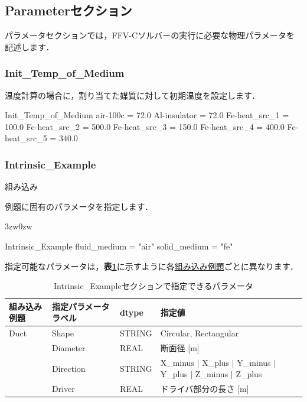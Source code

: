 \pagebreak
\subsection{Parameterセクション}

パラメータセクションでは，FFV-Cソルバーの実行に必要な物理パラメータを記述します．


\subsubsection{Init\_Temp\_of\_Medium}
温度計算の場合に，割り当てた\hypertarget{tgt:initial_temp}{媒質}に対して初期温度を設定します．


{\small
\begin{program}
  Init_Temp_of_Medium {
    air-100c      = 72.0
    Al-insulator  = 72.0
    Fe-heat_src_1 = 100.0
    Fe-heat_src_2 = 500.0
    Fe-heat_src_3 = 150.0
    Fe-heat_src_4 = 400.0
    Fe-heat_src_5 = 340.0
  }
\end{program}
}



\pagebreak
\subsubsection{Intrinsic\_Example}

\hypertarget{tgt:intrinsic_example}{組み込み}例題に固有のパラメータを指定します．

\begin{indentation}{3zw}{0zw}
\small

\begin{program}
  Intrinsic_Example {
    fluid_medium = "air"
    solid_medium = "fe"
  }
\end{program}

\normalsize
指定可能なパラメータは，\textbf{表\ref{tbl:intrinsic_parameter}}に示すように各\hyperlink{tgt:example}{組み込み例題}ごとに異なります．

\begin{table}[htdp]
\caption{Intrinsic\_Exampleセクションで指定できるパラメータ}
\begin{center}
\small
\begin{tabular}{llll} \toprule
組み込み例題 & 指定パラメータラベル & dtype & 指定値\\ \midrule
Duct & Shape     & STRING & Circular, Rectangular\\
     & Diameter  & REAL   & 断面径 [m]\\
     & Direction & STRING & X\_minus $|$ X\_plus $|$ Y\_minus $|$ Y\_plus $|$ Z\_minus $|$ Z\_plus\\
     & Driver    & REAL   & ドライバ部分の長さ [m]\\ \bottomrule
\end{tabular}
\end{center}
\label{tbl:intrinsic_parameter}
\end{table}

\end{indentation}



